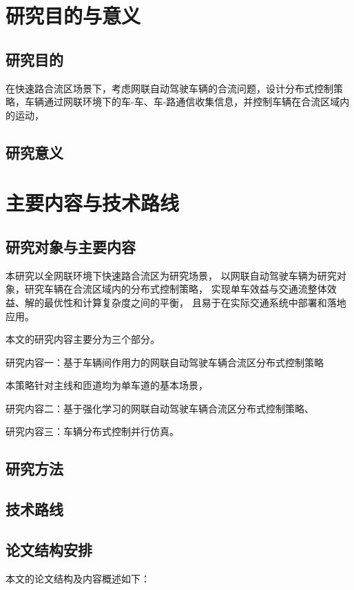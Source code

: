 \section{研究目的与意义}


\subsection{研究目的}
在快速路合流区场景下，考虑网联自动驾驶车辆的合流问题，设计分布式控制策略，车辆通过网联环境下的车-车、车-路通信收集信息，并控制车辆在合流区域内的运动，

\subsection{研究意义}

\section{主要内容与技术路线}

\subsection{研究对象与主要内容}
本研究以全网联环境下快速路合流区为研究场景，
以网联自动驾驶车辆为研究对象，研究车辆在合流区域内的分布式控制策略，
实现单车效益与交通流整体效益、解的最优性和计算复杂度之间的平衡，
且易于在实际交通系统中部署和落地应用。

本文的研究内容主要分为三个部分。

研究内容一：基于车辆间作用力的网联自动驾驶车辆合流区分布式控制策略

本策略针对主线和匝道均为单车道的基本场景，

研究内容二：基于强化学习的网联自动驾驶车辆合流区分布式控制策略、


研究内容三：车辆分布式控制并行仿真。

\subsection{研究方法}

\subsection{技术路线}

\subsection{论文结构安排}
本文的论文结构及内容概述如下：

